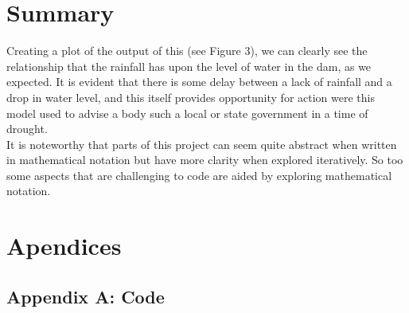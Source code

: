 \documentclass[a4paper, 11pt, oneside]{article}
\begin{document}
\section{Summary}

Creating a plot of the output of this (see Figure 3), we can clearly see the relationship that the rainfall has upon the level of water in the dam, as we expected. It is evident that there is some delay between a lack of rainfall and a drop in water level, and this itself provides opportunity for action were this model used to advise a body such a local or state government in a time of drought. \\

It is noteworthy that parts of this project can seem quite abstract when written in mathematical notation but have more clarity when explored iteratively. So too some aspects that are challenging to code are aided by exploring mathematical notation.\\










\newpage
\section{Apendices}
\subsection{Appendix A: Code}
\end{document}

